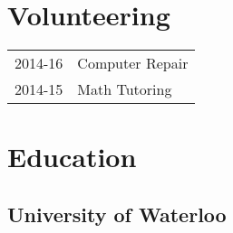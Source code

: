 \documentclass[dvipsnames]{deedy-resume-openfont}
\begin{document}
\begin{minipage}[t]{0.32\textwidth}
    

  \section{Volunteering} 

  \begin{tabular}{rl}
  2014-16   & Computer Repair \\
  2014-15 	& Math Tutoring \\
  \end{tabular}
  \sectionsep


  \section{Education}
  \subsection{University of Waterloo}
  \sectionsep
  


\end{minipage}
\end{document}
